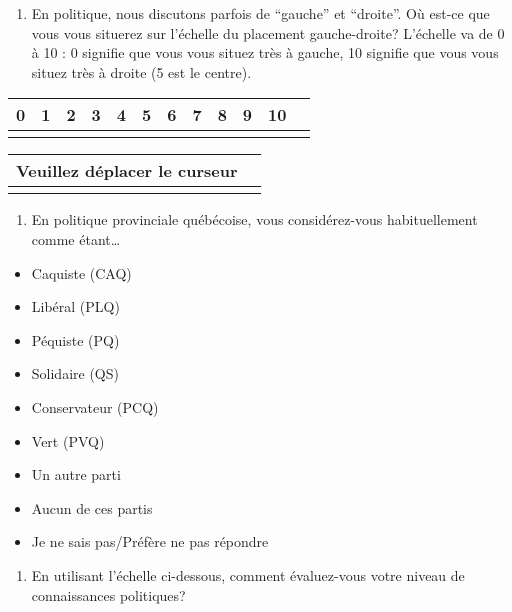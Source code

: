 \documentclass[
  letterpaper,
  DIV=11,
  numbers=noendperiod]{scrreprt}
\providecommand{\tightlist}{%
  \setlength{\itemsep}{0pt}\setlength{\parskip}{0pt}}\usepackage{longtable,booktabs,array}
\begin{document}
\begin{enumerate}
\def\labelenumi{\arabic{enumi}.}
\setcounter{enumi}{20}
\tightlist
\item
  En politique, nous discutons parfois de ``gauche'' et ``droite''. Où
  est-ce que vous vous situerez sur l'échelle du placement
  gauche-droite? L'échelle va de 0 à 10 : 0 signifie que vous vous
  situez très à gauche, 10 signifie que vous vous situez très à droite
  (5 est le centre).
\end{enumerate}

\begin{longtable}[]{@{}llllllllllll@{}}
\toprule\noalign{}
0 & 1 & 2 & 3 & 4 & 5 & 6 & 7 & 8 & 9 & 10 & \\
\midrule\noalign{}
\endhead
\bottomrule\noalign{}
\endlastfoot
\end{longtable}

\begin{longtable}[]{@{}ll@{}}
\toprule\noalign{}
Veuillez déplacer le curseur & \\
\midrule\noalign{}
\endhead
\bottomrule\noalign{}
\endlastfoot
\end{longtable}

\begin{enumerate}
\def\labelenumi{\arabic{enumi}.}
\setcounter{enumi}{21}
\tightlist
\item
  En politique provinciale québécoise, vous considérez-vous
  habituellement comme étant\ldots{}
\end{enumerate}

\begin{itemize}
\tightlist
\item
  Caquiste (CAQ)
\item
  Libéral (PLQ)
\item
  Péquiste (PQ)
\item
  Solidaire (QS)
\item
  Conservateur (PCQ)
\item
  Vert (PVQ)
\item
  Un autre parti
\item
  Aucun de ces partis
\item
  Je ne sais pas/Préfère ne pas répondre
\end{itemize}

\begin{enumerate}
\def\labelenumi{\arabic{enumi}.}
\setcounter{enumi}{22}
\tightlist
\item
  En utilisant l'échelle ci-dessous, comment évaluez-vous votre niveau
  de connaissances politiques?
\end{enumerate}
\end{document}
